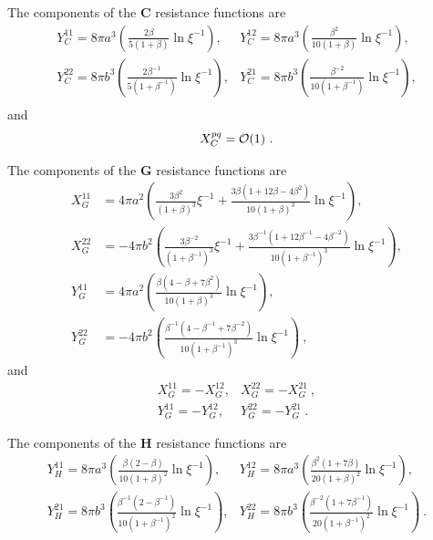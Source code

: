 \documentclass[reprint, amsmath,amssymb,aps,pre,onecolumn,notitlepage%
]{revtex4-1}
\begin{document}
The components of the $\bm{C}$ resistance functions are
\begin{equation}
\begin{split}
Y_C^{11}= 8 \pi a^3 \left(\frac{2\beta}{5 (1+\beta)} \ln{\xi^{-1}} \right),& Y_C^{12}= 8 \pi a^3 \left(\frac{\beta^2}{10 (1+\beta)} \ln{\xi^{-1}} \right),\\
Y_C^{22}= 8 \pi b^3 \left(\frac{2\beta^{-1}}{5 (1+\beta^{-1})} \ln{\xi^{-1}} \right),& Y_C^{21}= 8 \pi b^3 \left(\frac{\beta^{-2}}{10 (1+\beta^{-1})} \ln{\xi^{-1}} \right),\\
\end{split}
\end{equation}
and 
\begin{equation}
	X^{pq}_C =\mathcal{O}(1)\ .\\
\end{equation}


The components of the $\bm{G}$ resistance functions are
\begin{equation}
\begin{split}
	X_G^{11}&= 4 \pi a^2 \left( \frac{3 \beta^2}{(1+\beta)^3}\xi^{-1} + \frac{3 \beta (1+ 12 \beta - 4 \beta^2)}{10 (1+\beta)^3} \ln{\xi^{-1}}\right),\\
	X_G^{22}&= -4 \pi b^2 \left( \frac{3 \beta^{-2}}{(1+\beta^{-1})^3}\xi^{-1} + \frac{3 \beta^{-1} (1+ 12 \beta^{-1} - 4 \beta^{-2})}{10 (1+\beta^{-1})^3} \ln{\xi^{-1}}\right),\\
	Y_G^{11}&= 4 \pi a^2 \left(\frac{ \beta (4 - \beta + 7\beta^2)}{10 (1+\beta)^3} \ln{\xi^{-1}} \right),\\
	Y_G^{22}&= -4 \pi b^2 \left(\frac{ \beta^{-1} (4 -  \beta^{-1} + 7\beta^{-2})}{10 (1+\beta^{-1})^3} \ln{\xi^{-1}} \right)\ ,
\end{split}
\end{equation}
and 
\begin{equation}
\begin{split}
	X^{11}_G =-X^{12}_G, & X^{22}_G =-X^{21}_G\ ,\\
	Y^{11}_G =-Y^{12}_G, & Y^{22}_G =-Y^{21}_G \ .
\end{split}
\end{equation}


The components of the $\bm{H}$ resistance functions are
\begin{equation}
\begin{split}
Y_H^{11}= 8 \pi a^3 \left(\frac{\beta(2-\beta)}{10 (1+\beta)^2} \ln{\xi^{-1}} \right),& Y_H^{12}= 8 \pi a^3 \left(\frac{\beta^2(1+7\beta)}{20 (1+\beta)^2} \ln{\xi^{-1}} \right),\\
Y_H^{21}= 8 \pi b^3 \left(\frac{\beta^{-1}(2-\beta^{-1})}{10 (1+\beta^{-1})^2} \ln{\xi^{-1}} \right),& Y_H^{22}= 8 \pi b^3 \left(\frac{\beta^{-2}(1+7\beta^{-1})}{20 (1+\beta^{-1})^2} \ln{\xi^{-1}} \right)\ .
\end{split}
\end{equation}
\end{document}
